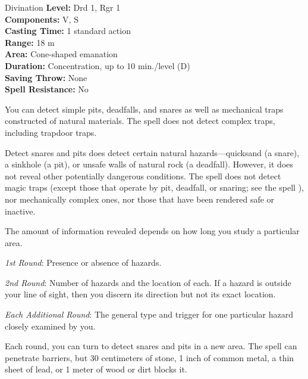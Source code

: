 {Divination}
{
	\textbf{Level:}
	Drd 1, Rgr 1\\
	\textbf{Components:}
	V, S\\
	\textbf{Casting Time:}
	1 standard action\\
	\textbf{Range:}
	18 m\\
	\textbf{Area:}
	Cone-shaped emanation\\
	\textbf{Duration:}
	Concentration, up to 10 min./level (D)\\
	\textbf{Saving Throw:}
	None\\
	\textbf{Spell Resistance:}
	No\\
}
{
	You can detect simple pits, deadfalls, and snares as well as mechanical traps constructed of natural materials. The spell does not detect complex traps, including trapdoor traps.

	Detect snares and pits does detect certain natural hazards---quicksand (a snare), a sinkhole (a pit), or unsafe walls of natural rock (a deadfall). However, it does not reveal other potentially dangerous conditions. The spell does not detect magic traps (except those that operate by pit, deadfall, or snaring; see the spell ), nor mechanically complex ones, nor those that have been rendered safe or inactive.

	The amount of information revealed depends on how long you study a particular area.

	\textit{1st Round}:
	Presence or absence of hazards.

	\textit{2nd Round}:
	Number of hazards and the location of each. If a hazard is outside your line of sight, then you discern its direction but not its exact location.

	\textit{Each Additional Round}:
	The general type and trigger for one particular hazard closely examined by you.

	Each round, you can turn to detect snares and pits in a new area. The spell can penetrate barriers, but 30 centimeters of stone, 1 inch of common metal, a thin sheet of lead, or 1 meter of wood or dirt blocks it.

}
